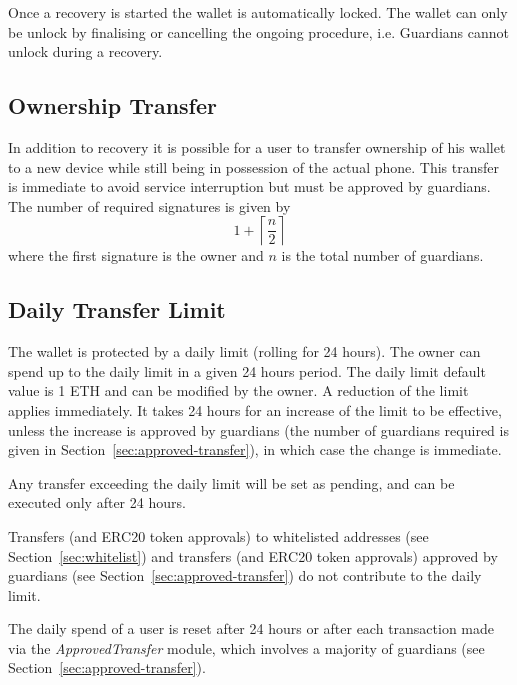 \documentclass[12pt]{article}
\begin{document}
Once a recovery is started the wallet is automatically locked. The wallet can only be unlock by finalising or cancelling the ongoing procedure, i.e. Guardians cannot unlock during a recovery.

\subsection{Ownership Transfer}

In addition to recovery it is possible for a user to transfer ownership of his wallet to a new device while still being in possession of the actual phone. This transfer is immediate to avoid service interruption but must be approved by guardians. The number of required signatures is given by
\begin{equation*}
    1+\left\lceil {\frac{n}{2}} \right\rceil
\end{equation*}
where the first signature is the owner and $n$ is the total number of guardians.

\subsection{Daily Transfer Limit}
\label{sec:dailylimit}
The wallet is protected by a daily limit (rolling for 24 hours). The owner can spend up to the daily limit in a given 24 hours period. The daily limit default value is 1 ETH and can be modified by the owner. A reduction of the limit applies immediately. It takes 24 hours for an increase of the limit to be effective, unless the increase is approved by guardians (the number of guardians required is given in Section~\ref{sec:approved-transfer}), in which case the change is immediate.

Any transfer exceeding the daily limit will be set as pending, and can be executed only after 24 hours.

Transfers (and ERC20 token approvals) to whitelisted addresses (see Section~\ref{sec:whitelist}) and transfers (and ERC20 token approvals) approved by guardians (see Section~\ref{sec:approved-transfer}) do not contribute to the daily limit.

The daily spend of a user is reset after 24 hours or after each transaction made via the \emph{ApprovedTransfer} module, which involves a majority of guardians (see Section~\ref{sec:approved-transfer}).
\end{document}

